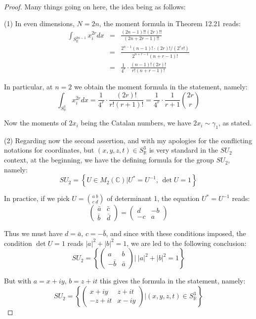 \documentclass[12pt]{amsbook}
\begin{document}
\begin{proof}
Many things going on here, the idea being as follows:

\medskip

(1) In even dimensions, $N=2n$, the moment formula in Theorem 12.21 reads:
\begin{eqnarray*}
\int_{S^{2n-1}_\mathbb R}x_i^{2r}dx
&=&\frac{(2n-1)!!(2r)!!}{(2n+2r-1)!!}\\
&=&\frac{2^{n-1}(n-1)!\cdot (2r)!/(2^rr!)}{2^{n+r-1}(n+r-1)!}\\
&=&\frac{1}{4^r}\cdot\frac{(n-1)!(2r)!}{r!(n+r-1)!}
\end{eqnarray*}

In particular, at $n=2$ we obtain the moment formula in the statement, namely:
$$\int_{S^3_\mathbb R}x_i^{2r}dx=\frac{1}{4^r}\cdot\frac{(2r)!}{r!(r+1)!}=\frac{1}{4^r}\cdot\frac{1}{r+1}\binom{2r}{r}$$

Now the moments of $2x_i$ being the Catalan numbers, we have $2x_i\sim\gamma_1$, as stated.

\medskip

(2) Regarding now the second assertion, and with my apologies for the conflicting notations for coordinates, but $(x,y,z,t)\in S^3_\mathbb R$ is very standard in the $SU_2$ context, at the beginning, we have the defining formula for the group $SU_2$, namely:
$$SU_2=\left\{U\in M_2(\mathbb C)\Big|U^*=U^{-1},\,\det U=1\right\}$$

In practice, if we pick $U=\binom{a\ b}{c\ d}$ of determinant 1, the equation $U^*=U^{-1}$ reads:
$$\begin{pmatrix}\bar{a}&\bar{c}\\ \bar{b}&\bar{d}\end{pmatrix}
=\begin{pmatrix}d&-b\\ -c&a\end{pmatrix}$$

Thus we must have $d=\bar{a}$, $c=-\bar{b}$, and since with these conditions imposed, the condition $\det U=1$ reads $|a|^2+|b|^2=1$, we are led to the following conclusion:
$$SU_2=\left\{\begin{pmatrix}a&b\\ -\bar{b}&\bar{a}\end{pmatrix}\Big|\ |a|^2+|b|^2=1\right\}$$

But with $a=x+iy$, $b=z+it$ this gives the formula in the statement, namely:
$$SU_2=\left\{\begin{pmatrix}x+iy&z+it\\ -z+it&x-iy\end{pmatrix}\Big|(x,y,z,t)\in S^3_\mathbb R\right\}$$


\end{proof}
\end{document}
